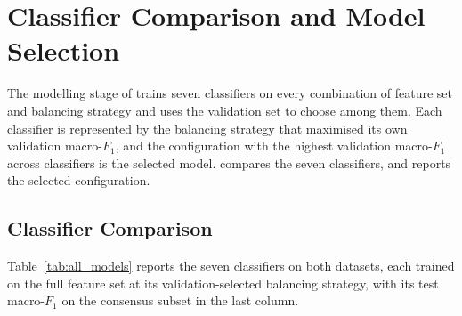 \section{Classifier Comparison and Model Selection}
\label{sec:resFinal}
The modelling stage of  trains seven classifiers on every combination of feature set and balancing strategy and uses the validation set to choose among them. Each classifier is represented by the balancing strategy that maximised its own validation macro-$F_1$, and the configuration with the highest validation macro-$F_1$ across classifiers is the selected model.  compares the seven classifiers, and  reports the selected configuration.

\subsection{Classifier Comparison}
\label{sec:resAllModels}
Table~\ref{tab:all_models} reports the seven classifiers on both datasets, each trained on the full feature set at its validation-selected balancing strategy, with its test macro-$F_1$ on the consensus subset in the last column.

